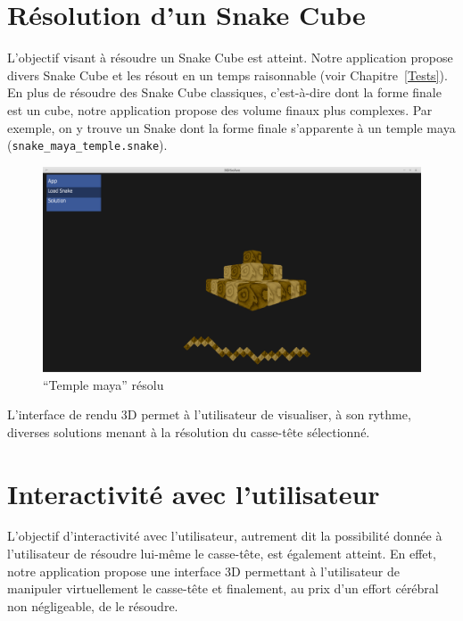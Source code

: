 \section{Résolution d'un Snake Cube}
L'objectif visant à résoudre un Snake Cube est atteint. Notre application propose divers Snake Cube et les résout en un temps raisonnable (voir Chapitre~\ref{Tests}). En plus de résoudre des Snake Cube classiques, c'est-à-dire dont la forme finale est un cube, notre application propose des volume finaux plus complexes. Par exemple, on y trouve un Snake dont la forme finale s'apparente à un temple maya (\verb|snake_maya_temple.snake|).

\begin{figure}[h]
 \centering
 \includegraphics[scale=0.3,keepaspectratio=true]{img/screenShot3.png}
 \caption{``Temple maya'' résolu}
 \label{screenShot3}
\end{figure}

L'interface de rendu 3D permet à l'utilisateur de visualiser, à son rythme, diverses solutions menant à la résolution du casse-tête sélectionné.

\newpage
\section{Interactivité avec l'utilisateur}
L'objectif d'interactivité avec l'utilisateur, autrement dit la possibilité donnée à l'utilisateur de résoudre lui-même le casse-tête, est également atteint. En effet, notre application propose une interface 3D permettant à l'utilisateur de manipuler virtuellement le casse-tête et finalement, au prix d'un effort cérébral non négligeable, de le résoudre.

